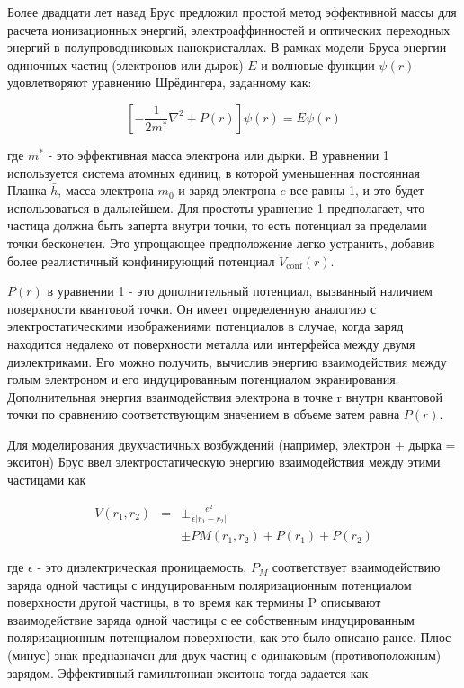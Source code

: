 \documentclass[a4paper,14pt]{extarticle}
\begin{document}
Более двадцати лет назад Брус предложил простой метод эффективной массы для расчета ионизационных энергий, электроаффинностей и оптических переходных энергий в полупроводниковых нанокристаллах. В рамках модели Бруса энергии одиночных частиц (электронов или дырок) \( E \) и волновые функции \( \psi(r) \) удовлетворяют уравнению Шрёдингера, заданному как:

\begin{equation}
    \left[ -\frac{1}{2m^*} \nabla^2 + P(r) \right] \psi(r) = E \psi(r)
    \end{equation}
    
где \( m^* \) - это эффективная масса электрона или дырки. В уравнении 1 используется система атомных единиц, в которой уменьшенная постоянная Планка \( \bar{h} \), масса электрона \( m_0 \) и заряд электрона \( e \) все равны 1, и это будет использоваться в дальнейшем. Для простоты уравнение 1 предполагает, что частица должна быть заперта внутри точки, то есть потенциал за пределами точки бесконечен. Это упрощающее предположение легко устранить, добавив более реалистичный конфинирующий потенциал \( V_{\text{conf}}(r) \).

\( P(r) \) в уравнении 1 - это дополнительный потенциал, вызванный наличием поверхности квантовой точки. Он имеет определенную аналогию с электростатическими изображениями потенциалов в случае, когда заряд находится недалеко от поверхности металла или интерфейса между двумя диэлектриками. Его можно получить, вычислив энергию взаимодействия между голым электроном и его индуцированным потенциалом экранирования. Дополнительная энергия взаимодействия электрона в точке r внутри квантовой точки по сравнению соответствующим значением в объеме затем равна \( P(r) \).

Для моделирования двухчастичных возбуждений (например, электрон + дырка = экситон) Брус ввел электростатическую энергию взаимодействия между этими частицами как

\begin{eqnarray}
    V(r_1, r_2) &=& \pm \frac{e^2}{\epsilon |r_1 - r_2|} \nonumber \\
    && \pm PM(r_1, r_2) + P(r_1) + P(r_2)
    \end{eqnarray}
    
где \( \epsilon \) - это диэлектрическая проницаемость, \( P_M \) соответствует взаимодействию заряда одной частицы с индуцированным поляризационным потенциалом поверхности другой частицы, в то время как термины P описывают взаимодействие заряда одной частицы с ее собственным индуцированным поляризационным потенциалом поверхности, как это было описано ранее. Плюс (минус) знак предназначен для двух частиц с одинаковым (противоположным) зарядом. Эффективный гамильтониан экситона тогда задается как
\end{document}
